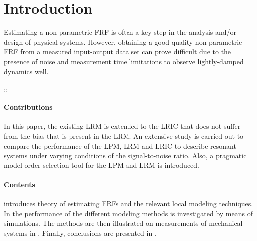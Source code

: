\section{Introduction}
Estimating a non-parametric \gls{FRF} is often a key step in the analysis and/or design of physical systems.
However, obtaining a good-quality non-parametric \gls{FRF} from a measured input-output data set can prove difficult due to the presence of noise and measurement time limitations to observe lightly-damped dynamics well.


\citep{Pintelon2010LPM1},\citep{Pintelon2010LPM2},\citep{McKelvey2012LRM}


\paragraph*{Contributions}
In this paper, the existing \gls{LRM} is extended to the \gls{LRIC} that does not suffer from  the bias that is present in the \gls{LRM}.
An extensive study is carried out to compare the performance of the \gls{LPM}, \gls{LRM} and \gls{LRIC} to describe resonant systems under varying conditions of the signal-to-noise ratio.
Also, a pragmatic model-order-selection tool for the \gls{LPM} and \gls{LRM} is introduced.

\paragraph*{Contents}
 introduces theory of estimating \glspl{FRF} and the relevant local modeling techniques.
In  the performance of the different modeling methods is investigated by means of simulations.
The methods are then illustrated on measurements of mechanical systems in .
Finally, conclusions are presented in .






